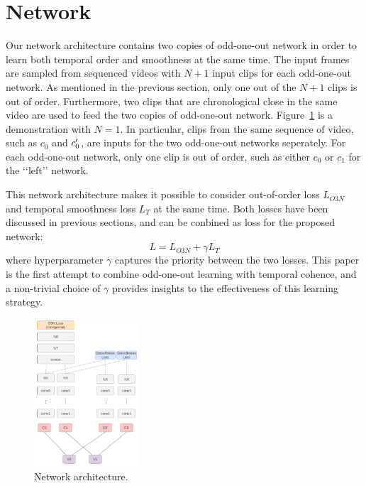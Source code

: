 \section{Network}\label{sec:network}

Our network architecture contains two copies of odd-one-out network in order to learn both temporal order and smoothness at the same time. 
The input frames are sampled from sequenced videos with $N+1$ input clips for each odd-one-out network.
As mentioned in the previous section, only one out of the $N+1$ clips is out of order. 
Furthermore, two clips that are chronological close in the same video are used to feed the two copies of odd-one-out network. 
Figure~\ref{fig:network} is a demonstration with $N=1$.
In particular, clips from the same sequence of video, such as $c_0$ and $c_0\rq{}$, are inputs for the two odd-one-out networks seperately.  
For each odd-one-out network, only one clip is out of order, such as either $c_0$ or $c_1$ for the \lq\lq{}left\rq\rq{} network.

This network architecture makes it possible to consider out-of-order loss $L_{O3N}$ and temporal smoothness loss $L_T$ at the same time. 
Both losses have been discussed in previous sections, and can be conbined as loss for the proposed network:
$$L = L_{O3N} + \gamma L_T$$
where hyperparameter $\gamma$ captures the priority between the two losses. 
This paper is the first attempt to combine odd-one-out learning with temporal cohence, and a non-trivial choice of $\gamma$ provides insights to the effectiveness of this learning strategy.

\begin{figure}
\centering
\includegraphics[width=0.35\textwidth]{images/network.png}
\caption{Network architecture.}
\label{fig:network}
\end{figure}